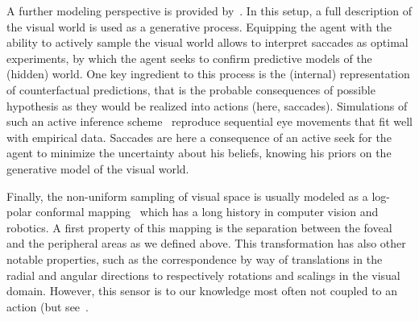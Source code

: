 A further modeling perspective is provided by~\citep{Friston12}. In this setup, a full description of the visual world is used as a generative process. %
Equipping the agent with the ability to actively sample the visual world %
allows to interpret saccades as optimal experiments, by which the agent seeks to confirm predictive models of the (hidden) world. One key ingredient to this process is the (internal) representation of counterfactual predictions, that is the probable consequences of possible hypothesis as they would be realized into actions (here, saccades).
Simulations of such an active inference scheme~\citep{Mirza18} 
reproduce sequential eye movements that fit well with empirical data. %
Saccades %
are here a consequence of an active seek for the agent to minimize the uncertainty about his beliefs, knowing his priors on the generative model of the visual world. %

Finally, the non-uniform sampling of visual space is usually modeled as a log-polar conformal mapping~\citep{Traver10} which has a long history in computer vision and robotics. A first property of this mapping is the separation between the foveal and the peripheral areas as we defined above. This transformation has also other notable properties, such as the correspondence by way of translations in the radial and angular directions to respectively rotations and scalings in the visual domain. However, this sensor is to our knowledge most often not coupled to an action
\ICANN
\else
 (but see~\citep{ref_needed)}\fi. 

